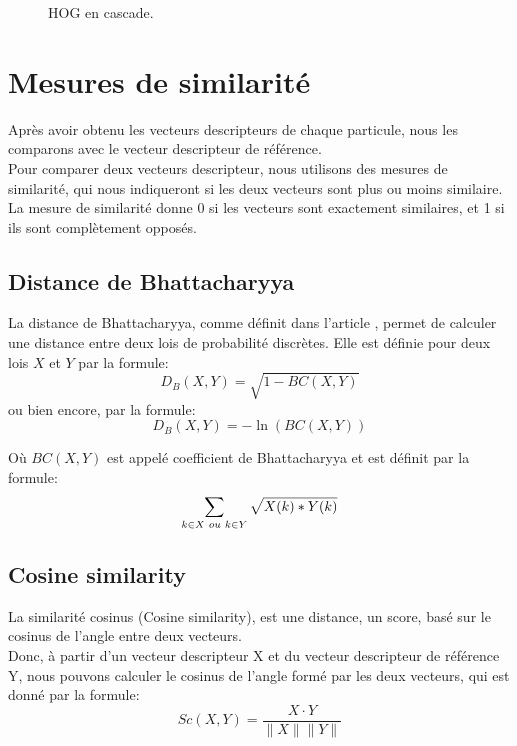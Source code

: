\begin{figure}[!htbp]
\center
\caption{HOG en cascade.}
\label{fig:cuttlefish_hog}
\end{figure}
\FloatBarrier




\section{Mesures de similarité}
Après avoir obtenu les vecteurs descripteurs de chaque particule, nous les comparons avec le vecteur descripteur de référence.\\
Pour comparer deux vecteurs descripteur, nous utilisons des mesures de similarité, qui nous indiqueront si les deux vecteurs sont plus ou moins similaire. La mesure de similarité donne 0 si les vecteurs sont exactement similaires, et 1 si ils sont complètement opposés.

\subsection{Distance de Bhattacharyya}
La distance de Bhattacharyya, comme définit dans l'article \cite{bhattacharyya_measure_1960}, permet de calculer une distance entre deux lois de probabilité discrètes. Elle est définie pour deux lois $X$ et $Y$ par la formule:
$$D_{B}(X, Y) = \sqrt{1 - BC(X, Y)}$$
ou bien encore, par la formule:
$$D_{B}(X, Y) = -\ln(BC(X, Y))$$

Où $BC(X, Y)$ est appelé coefficient de Bhattacharyya et est définit par la formule:
$$\sum_{k \in X \hspace{0.1cm} ou \hspace{0.1cm} k \in Y} \sqrt{X(k)*Y(k)}$$


\subsection{Cosine similarity}
La similarité cosinus (Cosine similarity), est une distance, un score, basé sur le cosinus de l'angle entre deux vecteurs.\\
Donc, à partir d'un vecteur descripteur X et du vecteur descripteur de référence Y, nous pouvons calculer le cosinus de l'angle formé par les deux vecteurs, qui est donné par la formule:
$$Sc(X, Y) = \frac{X \cdot Y}{\|X\|\|Y\|}$$\\


\clearpage
